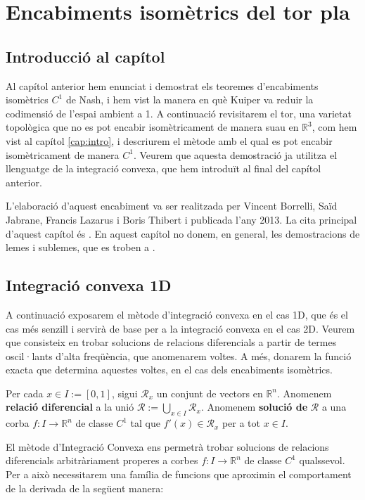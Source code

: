 \chapter{Encabiments isomètrics del tor pla}
\section{Introducció al capítol}
Al capítol anterior hem enunciat i demostrat els teoremes d'encabiments isomètrics $C^1$ de Nash, i hem vist la manera en què Kuiper va reduir la codimensió de l'espai ambient a 1. A continuació revisitarem el tor, una varietat topològica que no es pot encabir isomètricament de manera suau en $\mathbb R^3$, com hem vist al capítol \ref{cap:intro}, i descriurem el mètode amb el qual es pot encabir isomètricament de manera $C^1$. 
Veurem que aquesta demostració ja utilitza el llenguatge de la integració convexa, que hem introduït al final del capítol anterior.

L'elaboració d'aquest encabiment va ser realitzada per Vincent Borrelli, Saïd Jabrane, Francis Lazarus i Boris Thibert i publicada l'any 2013. La cita principal d'aquest capítol és \cite{borrelli2013}. En aquest capítol no donem, en general, les demostracions de lemes i sublemes, que es troben a \cite{borrelli2013}.

\section{Integració convexa 1D}
A continuació exposarem el mètode d'integració convexa en el cas 1D, que és el cas més senzill i servirà de base per a la integració convexa en el cas 2D. Veurem que consisteix en trobar solucions de relacions diferencials a partir de termes oscil·lants d'alta freqüència, que anomenarem voltes. A més, donarem la funció exacta que determina aquestes voltes, en el cas dels encabiments isomètrics.

\begin{defi}
    Per cada $x\in I := [0,1]$, sigui $\mathcal R_x$ un conjunt de vectors en $\mathbb R^n$. Anomenem \textbf{relació diferencial} a la unió $\mathcal R := \bigcup_{x\in I} \mathcal R_x$. Anomenem \textbf{solució de} $\mathcal R$ a una corba $f:I\to\mathbb R^n$ de classe $C^1$ tal que $f'(x)\in\mathcal R_x$ per a tot $x\in I$.
\end{defi}

El mètode d'Integració Convexa ens permetrà trobar solucions de relacions diferencials arbitràriament properes a corbes $f:I\to\mathbb R^n$ de classe $C^1$ qualssevol. Per a això necessitarem una família de funcions que aproximin el comportament de la derivada de la següent manera:

